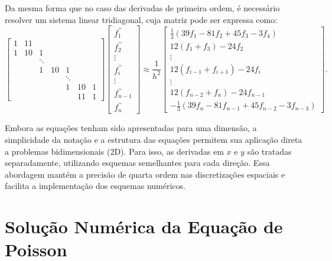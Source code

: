 Da mesma forma que no caso das derivadas de primeira ordem, é necessário resolver um sistema linear tridiagonal, cuja matriz pode ser expressa como:
\begin{equation}
\left[\begin{array}{ccccccc}
1 & 11 & & & & & \\
1 & 10 & 1 & & & & \\
& & \ddots & & & & \\
& & 1 & 10 & 1 & & \\
& & & & \ddots & & \\
& & & & 1 & 10 & 1 \\
& & & & & 11 & 1
\end{array}\right]\left[\begin{array}{c}
f_1^{\prime \prime} \\
f_2^{\prime \prime} \\
\vdots \\
f_i^{\prime \prime} \\
\vdots \\
f_{n-1}^{\prime \prime} \\
f_n^{\prime \prime}
\end{array}\right] \approx \frac{1}{h^2}\left[\begin{array}{c}\frac{1}{3}\left(39f_1 - 81f_2 + 45f_3 - 3f_4\right) \\ 12\left(f_1 + f_3\right) -24f_2 \\ \vdots \\ 12\left(f_{i-1} + f_{i+1}\right) -24f_{i} \\ \vdots \\ 12\left(f_{n-2} + f_{n}\right) -24f_{n-1}  \\ -\frac{1}{3}\left(39f_{n} - 81f_{n-1} + 45f_{n-2} - 3f_{n-3}\right)\end{array}\right].
\end{equation}

Embora as equações tenham sido apresentadas para uma dimensão, a simplicidade da notação e a estrutura das equações permitem sua aplicação direta a problemas bidimensionais (2D). Para isso, as derivadas em $x$ e $y$ são tratadas separadamente, utilizando esquemas semelhantes para cada direção. Essa abordagem mantém a precisão de quarta ordem nas discretizações espaciais e facilita a implementação dos esquemas numéricos.

\section{Solução Numérica da Equação de Poisson}

